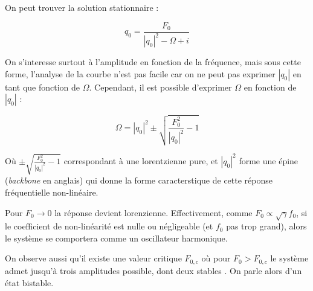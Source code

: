 On peut trouver la solution stationnaire :

\begin{equation}
    q_0 = \frac{F_0}{|q_0|^2 - \Omega + i}
    \label{eq:duff_stationnaire}
\end{equation}

On s'interesse surtout à l'amplitude en fonction de la fréquence, 
mais sous cette forme, l'analyse de la courbe n'est pas facile car 
on ne peut pas exprimer $|q_0|$ en tant que fonction de $\Omega$. 
Cependant, il est possible d'exprimer $\Omega$ en fonction de $|q_0|$ :

\begin{equation}
    \Omega = |q_0|^2 \pm \sqrt{\frac{F_0^2}{|q_0|^2} - 1 }
\end{equation}

Où $\pm \sqrt{\frac{F_0^2}{|q_0|^2} - 1 }$ correspondant à une lorentzienne pure, et $|q_0|^2$ forme 
une épine (\emph{backbone} en anglais) qui donne la forme caracterstique de cette réponse fréquentielle non-linéaire.

Pour $F_0 \to 0$ la réponse devient lorenzienne. Effectivement, comme $F_0 \propto \sqrt{\gamma} f_0$, 
si le coefficient de non-linéarité est nulle ou négligeable (et $f_0$ pas trop grand), alors le système 
se comportera comme un oscillateur harmonique.

On observe aussi qu'il existe une valeur critique $F_{0,c}$ où pour $F_0 > F_{0,c}$ le système admet 
jusqu'à trois amplitudes possible, dont deux stables \cite{landau_mechanics_1976}. On parle alors d'un état bistable.


